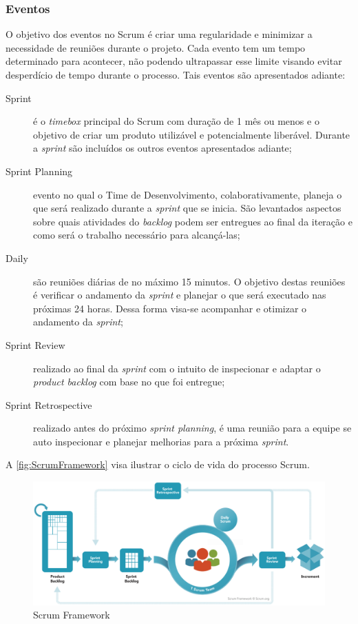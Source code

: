 \subsubsection{Eventos}

O objetivo dos eventos no Scrum é criar uma regularidade e minimizar a necessidade
de reuniões durante o projeto. Cada evento tem um tempo determinado para acontecer,
não podendo ultrapassar esse limite visando evitar desperdício de tempo durante o
processo. Tais eventos são apresentados adiante:

\begin{description}
    \item[Sprint] é o \textit{timebox} principal do Scrum com duração de 1 mês ou
    menos e o objetivo de criar um produto utilizável e potencialmente liberável.
    Durante a \textit{sprint} são incluídos os outros eventos apresentados adiante;
    \item[Sprint Planning] evento no qual o Time de Desenvolvimento, colaborativamente,
    planeja o que será realizado durante a \textit{sprint} que se inicia. São
    levantados aspectos sobre quais atividades do \textit{backlog} podem ser entregues
    ao final da iteração e como será o trabalho necessário para alcançá-las;
    \item[Daily] são reuniões diárias de no máximo 15 minutos. O objetivo destas
    reuniões é verificar o andamento da \textit{sprint} e planejar o que será executado
    nas próximas 24 horas. Dessa forma visa-se acompanhar e otimizar o andamento da
    \textit{sprint};
    \item[Sprint Review] realizado ao final da \textit{sprint} com o intuito de
    inspecionar e adaptar o \textit{product backlog} com base no que foi entregue;
    \item[Sprint Retrospective] realizado antes do próximo \textit{sprint planning}, é
    uma reunião para a equipe se auto inspecionar e planejar melhorias para a próxima
    \textit{sprint}.
\end{description}

A \autoref{fig:ScrumFramework} visa ilustrar o ciclo de vida do processo Scrum.

    \begin{figure}[h]
      \caption{Scrum Framework\label{fig:ScrumFramework}}
      \centering
      \includegraphics[keepaspectratio=true,scale=0.4]{figuras/scrumFramework.eps}
    \end{figure}

